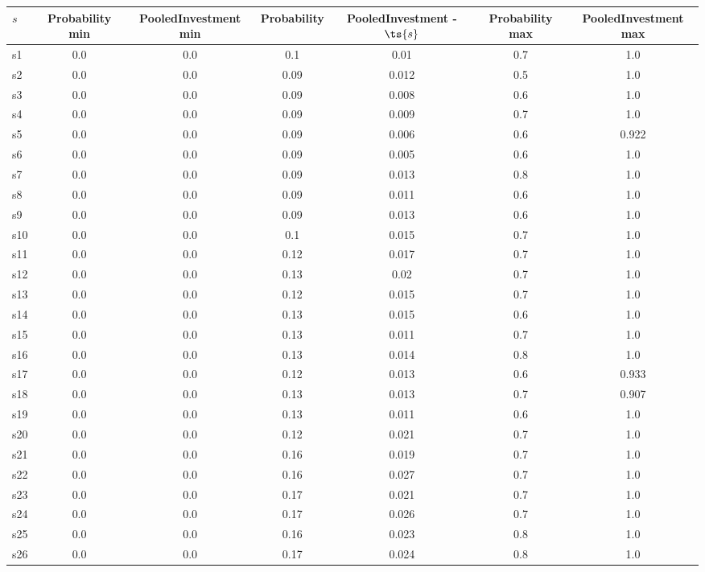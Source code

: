 \documentclass{article}
\begin{document}
\noindent\begin{tabular}{|l|c|c|c|c|c|c|}
\hline
$s$& Probability min & PooledInvestment min & Probability & PooledInvestment - $\ts{s}$ & Probability max & PooledInvestment max\\
\hline
s1 &0.0 & 0.0 & 0.1 & 0.01 & 0.7 & 1.0\\
\hline
s2 &0.0 & 0.0 & 0.09 & 0.012 & 0.5 & 1.0\\
\hline
s3 &0.0 & 0.0 & 0.09 & 0.008 & 0.6 & 1.0\\
\hline
s4 &0.0 & 0.0 & 0.09 & 0.009 & 0.7 & 1.0\\
\hline
s5 &0.0 & 0.0 & 0.09 & 0.006 & 0.6 & 0.922\\
\hline
s6 &0.0 & 0.0 & 0.09 & 0.005 & 0.6 & 1.0\\
\hline
s7 &0.0 & 0.0 & 0.09 & 0.013 & 0.8 & 1.0\\
\hline
s8 &0.0 & 0.0 & 0.09 & 0.011 & 0.6 & 1.0\\
\hline
s9 &0.0 & 0.0 & 0.09 & 0.013 & 0.6 & 1.0\\
\hline
s10 &0.0 & 0.0 & 0.1 & 0.015 & 0.7 & 1.0\\
\hline
s11 &0.0 & 0.0 & 0.12 & 0.017 & 0.7 & 1.0\\
\hline
s12 &0.0 & 0.0 & 0.13 & 0.02 & 0.7 & 1.0\\
\hline
s13 &0.0 & 0.0 & 0.12 & 0.015 & 0.7 & 1.0\\
\hline
s14 &0.0 & 0.0 & 0.13 & 0.015 & 0.6 & 1.0\\
\hline
s15 &0.0 & 0.0 & 0.13 & 0.011 & 0.7 & 1.0\\
\hline
s16 &0.0 & 0.0 & 0.13 & 0.014 & 0.8 & 1.0\\
\hline
s17 &0.0 & 0.0 & 0.12 & 0.013 & 0.6 & 0.933\\
\hline
s18 &0.0 & 0.0 & 0.13 & 0.013 & 0.7 & 0.907\\
\hline
s19 &0.0 & 0.0 & 0.13 & 0.011 & 0.6 & 1.0\\
\hline
s20 &0.0 & 0.0 & 0.12 & 0.021 & 0.7 & 1.0\\
\hline
s21 &0.0 & 0.0 & 0.16 & 0.019 & 0.7 & 1.0\\
\hline
s22 &0.0 & 0.0 & 0.16 & 0.027 & 0.7 & 1.0\\
\hline
s23 &0.0 & 0.0 & 0.17 & 0.021 & 0.7 & 1.0\\
\hline
s24 &0.0 & 0.0 & 0.17 & 0.026 & 0.7 & 1.0\\
\hline
s25 &0.0 & 0.0 & 0.16 & 0.023 & 0.8 & 1.0\\
\hline
s26 &0.0 & 0.0 & 0.17 & 0.024 & 0.8 & 1.0\\

\end{tabular}
\end{document}
